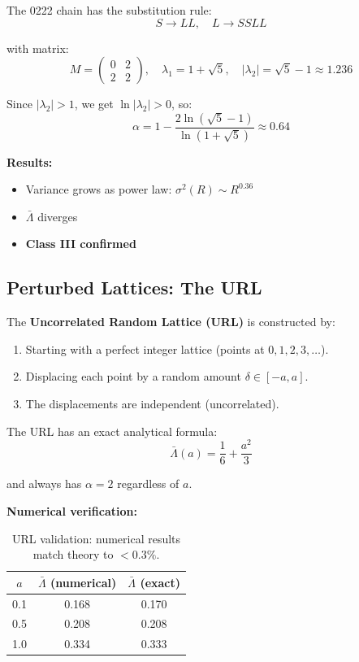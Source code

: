 \documentclass[11pt,letterpaper]{article}
\begin{document}
The 0222 chain has the substitution rule:
\[
S \to LL, \quad L \to SSLL
\]

with matrix:
\[
M = \begin{pmatrix} 0 & 2 \\ 2 & 2 \end{pmatrix}, \quad \lambda_1 = 1 + \sqrt{5}, \quad |\lambda_2| = \sqrt{5} - 1 \approx 1.236
\]

Since $|\lambda_2| > 1$, we get $\ln|\lambda_2| > 0$, so:
\[
\alpha = 1 - \frac{2\ln(\sqrt{5}-1)}{\ln(1+\sqrt{5})} \approx 0.64
\]

\textbf{Results:}
\begin{itemize}
    \item Variance grows as power law: $\sigma^2(R) \sim R^{0.36}$
    \item $\bar{\Lambda}$ diverges
    \item \textbf{Class III confirmed}
\end{itemize}

\subsection{Perturbed Lattices: The URL}

The \textbf{Uncorrelated Random Lattice (URL)} is constructed by:
\begin{enumerate}
    \item Starting with a perfect integer lattice (points at $0, 1, 2, 3, \ldots$).
    \item Displacing each point by a random amount $\delta \in [-a, a]$.
    \item The displacements are independent (uncorrelated).
\end{enumerate}

The URL has an exact analytical formula:
\[
\bar{\Lambda}(a) = \frac{1}{6} + \frac{a^2}{3}
\]

and always has $\alpha = 2$ regardless of $a$.

\textbf{Numerical verification:}
\begin{table}[H]
\centering
\begin{tabular}{ccc}
\toprule
$a$ & $\bar{\Lambda}$ (numerical) & $\bar{\Lambda}$ (exact) \\
\midrule
0.1 & 0.168 & 0.170 \\
0.5 & 0.208 & 0.208 \\
1.0 & 0.334 & 0.333 \\
\bottomrule
\end{tabular}
\caption{URL validation: numerical results match theory to $<0.3\%$.}
\end{table}
\end{document}
